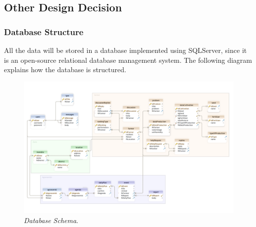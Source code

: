 \subsection{Other Design Decision}
\subsubsection{Database Structure}
All the data will be stored in a database implemented using SQLServer, since it is an open-source relational database management system.
The following diagram explains how the database is structured.
\begin{figure}[H]
    \centering
    \includegraphics[width=\textwidth]{Images/DB_schema.png}
    \caption{\textit{Database Schema}.}
\end{figure}